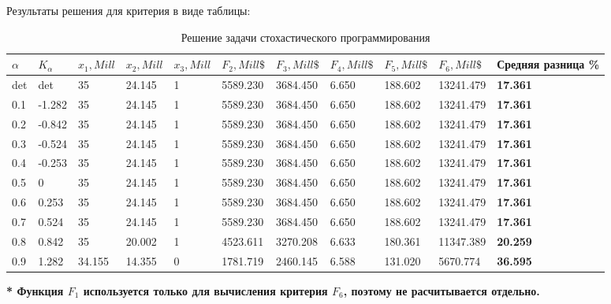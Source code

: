 Результаты решения для критерия в виде таблицы:

\begin{table}[h!]
	\centering
	\bgroup
	\captionsetup{singlelinecheck = false, format= hang, justification=raggedleft, font=footnotesize, labelsep=space}
	\caption{Решение задачи стохастического программирования}
	\def\arraystretch{1}
	\begin{tabular}{ | m{0.7cm} | m{1.0cm} | m{1.05cm} | m{1.05cm} | m{1.05cm} | m{1.35cm} | m{1.35cm} | m{1.35cm} | m{1.35cm} | m{1.35cm} | m{1.4cm} | }
		\hline
		$\alpha$ & $K_\alpha$ & $x_1, Mill$ & $x_2, Mill$ & $x_3, Mill$ & $F_2, Mill\$$ & $F_3, Mill\$$ & $F_4, Mill\$$ & $F_5, Mill\$$ & $F_6, Mill\$$ & Средняя разница \% \\ \hline
		det & det & 35 & 24.145 & 1 & 5589.230 & 3684.450 & 6.650 & 188.602 & 13241.479 & \textbf{17.361} \\ \hline
		0.1 & -1.282 & 35 & 24.145 & 1 & 5589.230 & 3684.450 & 6.650 & 188.602 & 13241.479 & \textbf{17.361} \\ \hline
		0.2 & -0.842 & 35 & 24.145 & 1 & 5589.230 & 3684.450 & 6.650 & 188.602 & 13241.479 & \textbf{17.361} \\ \hline
		0.3 & -0.524 & 35 & 24.145 & 1 & 5589.230 & 3684.450 & 6.650 & 188.602 & 13241.479 & \textbf{17.361} \\ \hline
		0.4 & -0.253 & 35 & 24.145 & 1 & 5589.230 & 3684.450 & 6.650 & 188.602 & 13241.479 & \textbf{17.361} \\ \hline
		0.5 & 0 & 35 & 24.145 & 1 & 5589.230 & 3684.450 & 6.650 & 188.602 & 13241.479 & \textbf{17.361} \\ \hline
		0.6 & 0.253 & 35 & 24.145 & 1 & 5589.230 & 3684.450 & 6.650 & 188.602 & 13241.479 & \textbf{17.361} \\ \hline
		0.7 & 0.524 & 35 & 24.145 & 1 & 5589.230 & 3684.450 & 6.650 & 188.602 & 13241.479 & \textbf{17.361} \\ \hline
		0.8 & 0.842 & 35 & 20.002 & 1 & 4523.611 & 3270.208 & 6.633 & 180.361 & 11347.389 & \textbf{20.259} \\ \hline
		0.9 & 1.282 & 34.155 & 14.355 & 0 & 1781.719 & 2460.145 & 6.588 & 131.020 & 5670.774 & \textbf{36.595} \\
		\hline
	\end{tabular}
	\egroup
\end{table}

\textbf{* Функция $F_1$ используется только для вычисления критерия $F_6$, поэтому не расчитывается отдельно.}

